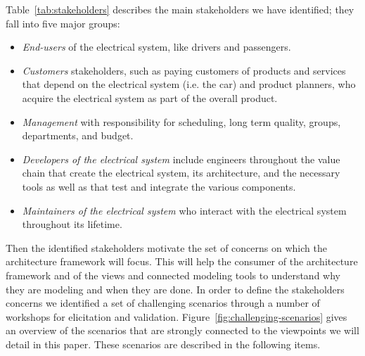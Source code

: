 Table~\ref{tab:stakeholders} describes the main stakeholders we have identified; they fall into five major groups: 

\begin{itemize}
\item \emph{End-users} of the electrical system, like drivers and passengers.
\item \emph{Customers} stakeholders, such as paying customers of products and services that depend on the electrical system (i.e. the car) and product planners, who acquire the electrical system as part of the overall product.
\item \emph{Management} with responsibility for scheduling, long term quality, groups, departments, and budget.
\item \emph{Developers of the electrical system}  include engineers throughout the value chain that create the electrical system, its architecture, and the necessary tools as well as that test and integrate the various components. 
\item \emph{Maintainers of the electrical system} who interact with the electrical system throughout its lifetime. 
\end{itemize}


Then the identified stakeholders motivate the set of concerns on which the architecture framework will focus.
This will help the consumer of the architecture framework and of the views and connected modeling tools to understand why
they are modeling and when they are done.
In order to define the stakeholders concerns we identified a set of challenging scenarios through a number of workshops for elicitation and validation. 
Figure~\ref{fig:challenging-scenarios} gives an overview of the scenarios that are strongly connected to the viewpoints we will detail in this paper. These scenarios are described in the following items.

